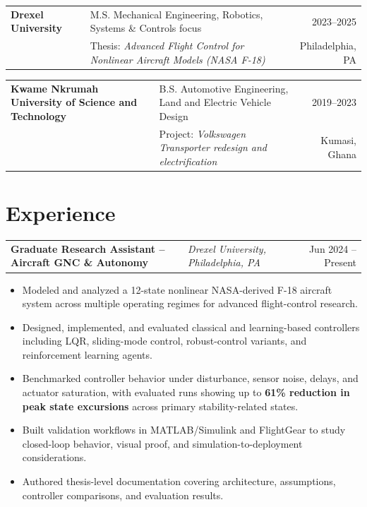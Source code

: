 \documentclass[10pt,letterpaper]{article}
\makeatletter
\newenvironment{role}[4]
{
\begin{tabularx}{\textwidth}{@{}l Y r@{}}
\textbf{#1} & \textit{#2, #3} & #4
\end{tabularx}
\vspace{-0.45em}
\begin{itemize}[leftmargin=1.2em, itemsep=0.18em, topsep=0.2em]
}
{
\end{itemize}
\vspace{0.15em}
}
\makeatother
\begin{document}
\begin{tabularx}{\textwidth}{@{}l Y r@{}}
\textbf{Drexel University} & M.S. Mechanical Engineering, Robotics, Systems \& Controls focus & 2023--2025 \\
& Thesis: \textit{Advanced Flight Control for Nonlinear Aircraft Models (NASA F-18)} & Philadelphia, PA
\end{tabularx}

\vspace{0.35em}

\begin{tabularx}{\textwidth}{@{}l Y r@{}}
\textbf{Kwame Nkrumah University of Science and Technology} & B.S. Automotive Engineering, Land and Electric Vehicle Design & 2019--2023 \\
& Project: \textit{Volkswagen Transporter redesign and electrification} & Kumasi, Ghana
\end{tabularx}

\section{Experience}

\begin{role}
{Graduate Research Assistant -- Aircraft GNC \& Autonomy}
{Drexel University}
{Philadelphia, PA}
{Jun 2024 -- Present}
    \item Modeled and analyzed a 12-state nonlinear NASA-derived F-18 aircraft system across multiple operating regimes for advanced flight-control research.
    \item Designed, implemented, and evaluated classical and learning-based controllers including LQR, sliding-mode control, robust-control variants, and reinforcement learning agents.
    \item Benchmarked controller behavior under disturbance, sensor noise, delays, and actuator saturation, with evaluated runs showing up to \textbf{61\% reduction in peak state excursions} across primary stability-related states.
    \item Built validation workflows in MATLAB/Simulink and FlightGear to study closed-loop behavior, visual proof, and simulation-to-deployment considerations.
    \item Authored thesis-level documentation covering architecture, assumptions, controller comparisons, and evaluation results.
\end{role}
\end{document}
